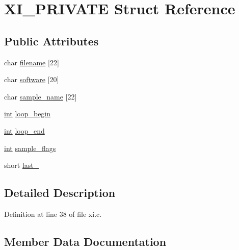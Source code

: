 \hypertarget{struct_x_i___p_r_i_v_a_t_e}{}\section{X\+I\+\_\+\+P\+R\+I\+V\+A\+TE Struct Reference}
\label{struct_x_i___p_r_i_v_a_t_e}
\subsection*{Public Attributes}
\begin{DoxyCompactItemize}
\item 
char \hyperlink{struct_x_i___p_r_i_v_a_t_e_a41df2b0ee43686ada53d4b7358549cf0}{filename} \mbox{[}22\mbox{]}
\item 
char \hyperlink{struct_x_i___p_r_i_v_a_t_e_ae3247b2582a6b769380112a75241cb0a}{software} \mbox{[}20\mbox{]}
\item 
char \hyperlink{struct_x_i___p_r_i_v_a_t_e_a169e3fb7547ff939aa80065fc747fa89}{sample\+\_\+name} \mbox{[}22\mbox{]}
\item 
\hyperlink{xmltok_8h_a5a0d4a5641ce434f1d23533f2b2e6653}{int} \hyperlink{struct_x_i___p_r_i_v_a_t_e_a0dbacd051afcb9023d4e4697332b1920}{loop\+\_\+begin}
\item 
\hyperlink{xmltok_8h_a5a0d4a5641ce434f1d23533f2b2e6653}{int} \hyperlink{struct_x_i___p_r_i_v_a_t_e_a9a68573bd1231a7ae0f0c63cb2aa686e}{loop\+\_\+end}
\item 
\hyperlink{xmltok_8h_a5a0d4a5641ce434f1d23533f2b2e6653}{int} \hyperlink{struct_x_i___p_r_i_v_a_t_e_a12634f288d83a961e0e834c76beebd69}{sample\+\_\+flags}
\item 
short \hyperlink{struct_x_i___p_r_i_v_a_t_e_abc466cf0cd59d2a3a148ad66c2a15b07}{last\+\_}
\end{DoxyCompactItemize}


\subsection{Detailed Description}


Definition at line 38 of file xi.\+c.



\subsection{Member Data Documentation}
